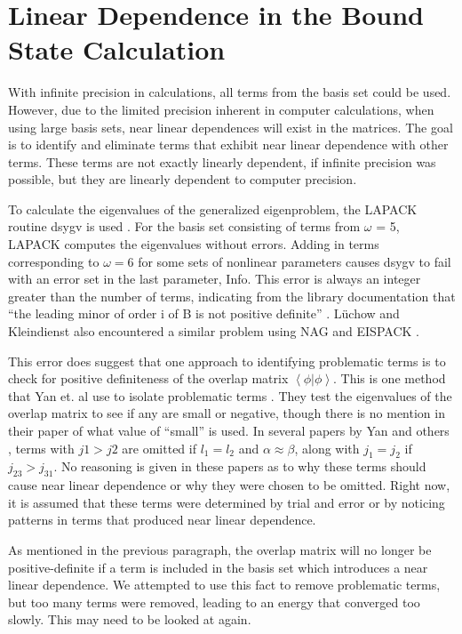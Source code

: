 \documentclass[Dissertation.tex]{subfiles}
\begin{document}
\section{Linear Dependence in the Bound State Calculation}
With infinite precision in calculations, all terms from the basis set could be used. However, due to the limited precision inherent in computer calculations, when using large basis sets, near linear dependences will exist in the matrices. The goal is to identify and eliminate terms that exhibit near linear dependence with other terms. These terms are not exactly linearly dependent, if infinite precision was possible, but they are linearly dependent to computer precision.

To calculate the eigenvalues of the generalized eigenproblem, the LAPACK routine dsygv is used \cite{dsygv}. For the basis set consisting of terms from $\omega$ = 5, LAPACK computes the eigenvalues without errors. Adding in terms corresponding to $\omega = 6$ for some sets of nonlinear parameters causes dsygv to fail with an error set in the last parameter, Info. This error is always an integer greater than the number of terms, indicating from the library documentation that ``the leading minor of order i of B is not positive definite'' \cite{dsygv}. L\"uchow and Kleindienst also encountered a similar problem using NAG and EISPACK \cite{Luchow1993}.

This error does suggest that one approach to identifying problematic terms is to check for positive definiteness of the overlap matrix $\left\langle \phi | \phi \right\rangle$. This is one method that Yan et. al use to isolate problematic terms \cite{Yan1999}. They test the eigenvalues of the overlap matrix to see if any are small or negative, though there is no mention in their paper of what value of ``small'' is used. In several papers by Yan and others \cite{Yan1998,Yan1998a,Yan1999,Drake1995,Yan1997a}, terms with $j1 > j2$ are omitted if $l_1 = l_2$ and $\alpha \approx \beta$, along with $j_1 = j_2$ if $j_{23} > j_{31}$. No reasoning is given in these papers as to why these terms should cause near linear dependence or why they were chosen to be omitted. Right now, it is assumed that these terms were determined by trial and error or by noticing patterns in terms that produced near linear dependence.

As mentioned in the previous paragraph, the overlap matrix will no longer be positive-definite if a term is included in the basis set which introduces a near linear dependence. We attempted to use this fact to remove problematic terms, but too many terms were removed, leading to an energy that converged too slowly. This may need to be looked at again.
\end{document}
